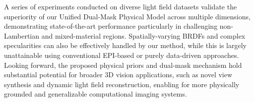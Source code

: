 A series of experiments conducted on diverse light field datasets validate the superiority of our Unified Dual-Mask Physical Model across multiple dimensions, demonstrating state-of-the-art performance particularly in challenging non-Lambertian and mixed-material regions. Spatially-varying BRDFs and complex specularities can also be effectively handled by our method, while this is largely unattainable using conventional EPI-based or purely data-driven approaches. Looking forward, the proposed physical priors and dual-mask mechanism hold substantial potential for broader 3D vision applications, such as novel view synthesis and dynamic light field reconstruction, enabling for more physically grounded and generalizable computational imaging systems.
